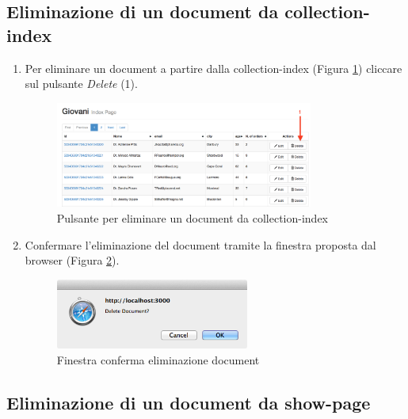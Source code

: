 	\subsection{Eliminazione di un document da collection-index} %
	\label{eliminadocumentdacollectionindex}
		\begin{enumerate}
			\item Per eliminare un document a partire dalla collection-index (Figura \ref{fig:eliminadocumentdacollectionindex}) cliccare sul pulsante \emph{Delete} (1).

					\begin{figure}[H]
						\centering \includegraphics[width=0.8\textwidth]{img/eliminadocumentdacollectionindex.png}
					\caption{\label{fig:eliminadocumentdacollectionindex} Pulsante per eliminare un document da collection-index}
					\end{figure}

			\item \label{confermaEliminazDocument} Confermare l'eliminazione del document tramite la finestra proposta dal browser (Figura \ref{fig:confermaEliminazDocument}).
					\begin{figure}[H]
							\centering \includegraphics[width=0.6\textwidth]{img/confermaEliminazDocument.png}
					\caption{\label{fig:confermaEliminazDocument} Finestra conferma eliminazione document}
					\end{figure}

		\end{enumerate}
	
	\clearpage
	\subsection{Eliminazione di un document da show-page} %
	\label{eliminazionedocumentdashowpage}

